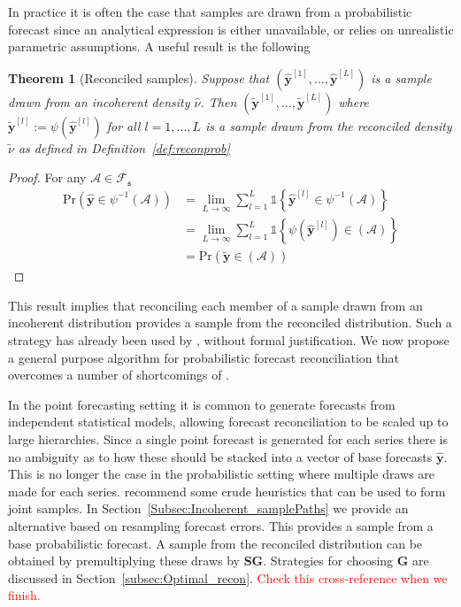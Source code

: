 \documentclass[12pt]{article}
\newtheorem{theo}{Theorem}[section]
\theoremstyle{definition}
\begin{document}
In practice it is often the case that samples are drawn from a probabilistic forecast since an analytical expression is either unavailable, or relies on unrealistic parametric assumptions.  A useful result is the following
\begin{theo}[Reconciled samples]
	Suppose that $\left(\hat{\bm y}^{[1]},\ldots,\hat{\bm y}^{[L]}\right)$ is a sample drawn from an incoherent density $\hat{\nu}$.  Then $\left(\tilde{\bm y}^{[1]},\ldots,\tilde{\bm y}^{[L]}\right)$ where $\tilde{\bm y}^{[l]}:=\psi(\hat{\bm y}^{[l]})$ for all $l=1,\ldots,L$ is a sample drawn from the reconciled density $\tilde{\nu}$ as defined in Definition~\ref{def:reconprob}
\end{theo}
\begin{proof}
	For any $\mathcal{A}\in\mathscr{F}_{\mathfrak{s}}$
\begin{align}
	\mbox{Pr}(\hat{{\bm y}}\in\psi^{-1}(\mathcal{A}))&=\underset{L\rightarrow\infty}{\lim}\sum\limits_{l=1}^L\mathbb{1}\left\{\hat{\bm y}^{[l]}\in\psi^{-1}(\mathcal{A})\right\}\nonumber\\
	&=\underset{L\rightarrow\infty}{\lim}\sum\limits_{l=1}^L\mathbb{1}\left\{\psi(\hat{\bm y}^{[l]})\in(\mathcal{A})\right\}\nonumber\\
	&=\mbox{Pr}(\tilde{{\bm y}}\in(\mathcal{A}))\nonumber
\end{align}
\end{proof}

This result implies that reconciling each member of a sample drawn from an incoherent distribution provides a sample from the reconciled distribution.  Such a strategy has already been used by \cite{JeoEtAl2019}, without formal justification.  We now propose a general purpose algorithm for probabilistic forecast reconciliation that overcomes a number of shortcomings of \cite{JeoEtAl2019}.

In the point forecasting setting it is common to generate forecasts from independent statistical models, allowing forecast reconciliation to be scaled up to large hierarchies.  Since a single point forecast is generated for each series there is no ambiguity as to how these should be stacked into a vector of base forecasts $\hat{\bm{y}}$.  This is no longer the case in the probabilistic setting where multiple draws are made for each series.  \cite{JeoEtAl2019} recommend some crude heuristics that can be used to form joint samples.  In Section~\ref{Subsec:Incoherent_samplePaths} we provide an alternative based on resampling forecast errors. This provides a sample from a base probabilistic forecast. A sample from the reconciled distribution can be obtained by premultiplying these draws by $\bm{S}\bm{G}$. Strategies for choosing $\bm{G}$ are discussed in Section~\ref{subsec:Optimal_recon}. \textcolor{red}{Check this cross-reference when we finish.}
\end{document}

